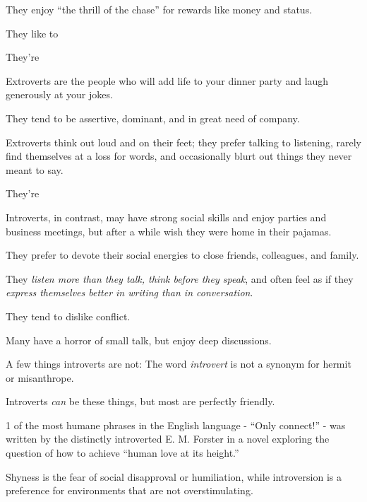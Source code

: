 \documentclass[oneside]{article}
\numberwithin{equation}{section}
\begin{document}
They enjoy ``the thrill of the chase'' for rewards like money and status.

%

They like to 

They're 

%

Extroverts are the people who will add life to your dinner party and laugh generously at your jokes.

They tend to be assertive, dominant, and in great need of company.

Extroverts think out loud and on their feet; they prefer talking to listening, rarely find themselves at a loss for words, and occasionally blurt out things they never meant to say.

They're 

%
Introverts, in contrast, may have strong social skills and enjoy parties and business meetings, but after a while wish they were home in their pajamas.

They prefer to devote their social energies to close friends, colleagues, and family.

They \textit{listen more than they talk, think before they speak}, and often feel as if they \textit{express themselves better in writing than in conversation}.

They tend to dislike conflict.

Many have a horror of small talk, but enjoy deep discussions.

%
A few things introverts are not: The word \textit{introvert} is not a synonym for hermit or misanthrope.

Introverts \textit{can} be these things, but most are perfectly friendly.

1 of the most humane phrases in the English language - ``Only connect!'' - was written by the distinctly introverted E. M. Forster in a novel exploring the question of how to achieve ``human love at its height.''

%

Shyness is the fear of social disapproval or humiliation, while introversion is a preference for environments that are not overstimulating.
\end{document}
